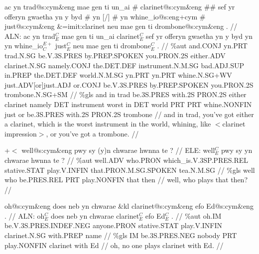 \documentclass[a4paper,10pt]{article}
\begin{document}
\ex
\begingl[lingstyle=gergl]
\glchat ac yn trad@s:cym\&eng mae gen ti un\_ai \# clarinet@s:cym\&eng \#\# sef yr offeryn gwaetha yn y byd \# yn [/] \# yn whine\_io@s:eng+cym \# just@s:cym\&eng \&=imit:clarinet neu mae gen ti drombone@s:cym\&eng . //
\glsurface ALN:  ac yn trad$^{C}_{E}$ mae gen ti un\_ai clarinet$^{C}_{E}$ sef yr offeryn gwaetha yn y byd yn yn whine\_io$^{E+}_{C}$ just$^{C}_{E}$ neu mae gen ti drombone$^{C}_{E}$ .  //
\glauto \%aut  and{\scriptsize .CONJ} yn{\scriptsize .PRT} trad{\scriptsize .N.SG} be{\scriptsize .V.3S.PRES} by{\scriptsize .PREP.SPOKEN} you{\scriptsize .PRON.2S} either{\scriptsize .ADV} clarinet{\scriptsize .N.SG} namely{\scriptsize .CONJ} the{\scriptsize .DET.DEF} instrument{\scriptsize .N.M.SG} bad{\scriptsize .ADJ.SUP} in{\scriptsize .PREP} the{\scriptsize .DET.DEF} world{\scriptsize .N.M.SG} yn{\scriptsize .PRT} yn{\scriptsize .PRT} whine{\scriptsize .N.SG+WV} just{\scriptsize .ADV[or]just.ADJ} or{\scriptsize .CONJ} be{\scriptsize .V.3S.PRES} by{\scriptsize .PREP.SPOKEN} you{\scriptsize .PRON.2S} trombone{\scriptsize .N.SG+SM}   //
\glmanual \%gls  and in trad be{\scriptsize .3S.PRES} with{\scriptsize .2S} PRON{\scriptsize .2S} either clarinet namely DET instrument worst in DET world PRT PRT whine{\scriptsize .NONFIN} just or be{\scriptsize .3S.PRES} with{\scriptsize .2S} PRON{\scriptsize .2S} trombone   //
\gleng and in trad, you've got either a clarinet, which is the worst instrument in the world, whining, like $<$clarinet impression$>$, or you've got a trombone. //
\endgl
\xe

\ex
\begingl[lingstyle=gergl]
\glchat +$<$ well@s:cym\&eng pwy sy (y)n chwarae hwnna te ? //
\glsurface ELE:  well$^{C}_{E}$ pwy sy yn chwarae hwnna te ?  //
\glauto \%aut  well{\scriptsize .ADV} who{\scriptsize .PRON} which\_is{\scriptsize .V.3SP.PRES.REL} stative{\scriptsize .STAT} play{\scriptsize .V.INFIN} that{\scriptsize .PRON.M.SG.SPOKEN} tea{\scriptsize .N.M.SG}   //
\glmanual \%gls  well who be{\scriptsize .PRES.REL} PRT play{\scriptsize .NONFIN} that then   //
\gleng well, who plays that then? //
\endgl
\xe

\ex
\begingl[lingstyle=gergl]
\glchat oh@s:cym\&eng does neb yn chwarae \&kl clarinet@s:cym\&eng efo Ed@s:cym\&eng . //
\glsurface ALN:  oh$^{C}_{E}$ does neb yn chwarae clarinet$^{C}_{E}$ efo Ed$^{C}_{E}$ .  //
\glauto \%aut  oh{\scriptsize .IM} be{\scriptsize .V.3S.PRES.INDEF.NEG} anyone{\scriptsize .PRON} stative{\scriptsize .STAT} play{\scriptsize .V.INFIN} clarinet{\scriptsize .N.SG} with{\scriptsize .PREP} name   //
\glmanual \%gls  IM be{\scriptsize .3S.PRES.NEG} nobody PRT play{\scriptsize .NONFIN} clarinet with Ed   //
\gleng oh, no one plays clarinet with Ed. //
\endgl
\xe
\end{document}
